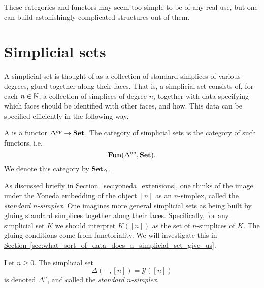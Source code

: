 \documentclass[main.tex]{subfiles}
\begin{document}
These categories and functors may seem too simple to be of any real use, but one can build astonishingly complicated structures out of them.

\section{Simplicial sets}
\label{sec:simplicial_sets}

A simplicial set is thought of as a collection of standard simplices of various degrees, glued together along their faces. That is, a simplicial set consists of, for each $n \in \mathbb{N}$, a collection of simplices of degree $n$, together with data specifying which faces should be identified with other faces, and how. This data can be specified efficiently in the following way.

\begin{definition}
  \label{def:simplicial_set}
  A  is a functor $\Delta^{\mathrm{op}} \to \mathbf{Set}$. The category of simplicial sets is the category of such functors, i.e.\
  \begin{equation*}
    \mathbf{Fun}(\Delta^{\mathrm{op}}, \mathbf{Set}).
  \end{equation*}
  We denote this category by $\operatorname{\mathbf{Set}_{\Delta}}$.
\end{definition}

As discussed briefly in \hyperref[sec:yoneda_extensions]{Section~\ref*{sec:yoneda_extensions}}, one thinks of the image under the Yoneda embedding of the object $[n]$ as an $n$-simplex, called the \emph{standard $n$-simplex.} One imagines more general simplicial sets as being built by gluing standard simplices together along their faces. Specifically, for any simplicial set $K$ we should interpret $K([n])$ as the set of $n$-simplices of $K$. The gluing conditions come from functoriality. We will investigate this in \hyperref[sec:what_sort_of_data_does_a_simplicial_set_give_us]{Section~\ref*{sec:what_sort_of_data_does_a_simplicial_set_give_us}}.

\begin{definition}
  \label{eg:standard_simplex}
  Let $n \geq 0$. The simplicial set
  \begin{equation*}
    \Delta(-, [n]) = \mathcal{Y}([n])
  \end{equation*}
  is denoted $\Delta^{n}$, and called the \emph{standard $n$-simplex.}
\end{definition}
\end{document}
